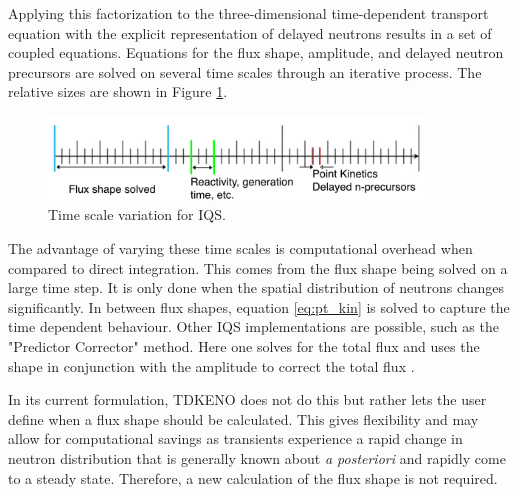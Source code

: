 \documentclass[11pt]{article}
\begin{document}
Applying this factorization to the three-dimensional time-dependent transport equation with the explicit representation of delayed neutrons results in a set of coupled equations.  Equations for the flux shape, amplitude, and delayed neutron precursors are solved on several time scales through an iterative process. The relative sizes are shown in Figure \ref{fig:time_scale}. 

\begin{figure}[h]
    \centering
    \includegraphics[width=10cm]{figures/time_scale.pdf}
    \caption{Time scale variation for IQS.}
    \label{fig:time_scale}
\end{figure}

The advantage of varying these time scales is computational overhead when compared to direct integration.  This comes from the flux shape being solved on a large time step. It is only done when the spatial distribution of neutrons changes significantly.  In between flux shapes, equation \ref{eq:pt_kin} is solved to capture the time dependent behaviour.  Other IQS implementations are possible, such as  the "Predictor Corrector" method.  Here one solves for the total flux and uses the shape in conjunction with the amplitude to correct the total flux \cite{Dulla}.  

 In its current formulation, TDKENO does not do this but rather lets the user define when a flux shape should be calculated.  This gives flexibility and may allow for computational savings as transients experience a rapid change in neutron distribution that is generally known about \emph{a posteriori} and rapidly come to a steady state. Therefore, a new calculation of the flux shape is not required.
\end{document}

